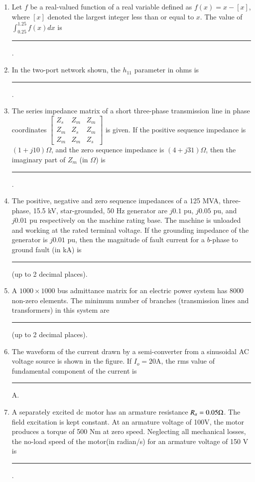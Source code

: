 \documentclass[journal,12pt,onecolumn]{IEEEtran}
\theoremstyle{remark}
\begin{document}
\begin{enumerate}
    \item Let $f$ be a real-valued function of a real variable defined as $f(x)=x-[x]$, where $[x]$ denoted the largest integer less than or equal to $x$. The value of $\int_{0.25}^{1.25} f(x)dx$ is \rule{2cm}{0.4pt}.
    
    \item In the two-port network shown, the $h_{11}$ parameter  in ohms is \rule{2.5cm}{0.4pt}.
    
    
    \item The series impedance matrix of a short three-phase transmission line in phase coordinates
$
\begin{bmatrix}
Z_s & Z_m & Z_m \\
Z_m & Z_s & Z_m \\
Z_m & Z_m & Z_s 
\end{bmatrix}
$
is given. If the positive sequence impedance is $ (1 + j10) \Omega $, and the zero sequence impedance is $ (4 + j31) \Omega$, then the imaginary part of $ Z_m $ (in $ \Omega $) is\rule{2.5cm}{0.4pt} .

\item The positive, negative and zero sequence impedances of a 125 MVA, three-phase, 15.5 kV, star-grounded, 50 Hz generator are $ j0.1 $ pu, $ j0.05 $ pu, and $ j0.01 $ pu respectively on the machine rating base. The machine is unloaded and working at the rated terminal voltage. If the grounding impedance of the generator is $ j0.01 $ pu, then the magnitude of fault current for a $ b $-phase to ground fault (in kA) is \rule{2cm}{0.4pt} (up to 2 decimal places).

\item A $ 1000 \times 1000$ bus admittance matrix for an electric power system has 8000 non-zero elements. The minimum number of branches (transmission lines and transformers) in this system are \rule{2cm}{0.4pt}(up to 2 decimal places).

\item The waveform of the current drawn by a semi-converter from a sinusoidal AC voltage source is shown in the figure. If $I_o=20$A, the rms value of fundamental component of the current is \rule{2cm}{0.4pt}A.


\item A separately excited dc motor has an armature resistance $R_a=0.05\ohm$. The field excitation is kept constant. At an armature voltage of 100V, the motor produces a torque of 500 Nm at zero speed. Neglecting all mechanical losses, the no-load speed of the motor(in radian/s) for an armature voltage of 150 V is \rule{2cm}{0.4pt}.


\end{enumerate}
\end{document}
